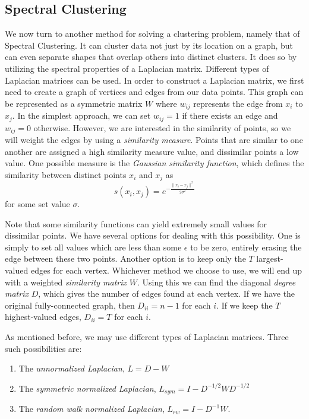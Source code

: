 \subsection*{Spectral Clustering}
We now turn to another method for solving a clustering problem, namely that of Spectral Clustering. 
It can cluster data not just by its location on a graph, but can even separate shapes that overlap others into distinct clusters. 
It does so by utilizing the spectral properties of a Laplacian matrix. 
Different types of Laplacian matrices can be used. 
In order to construct a Laplacian matrix, we first need to create a graph of vertices and edges from our data points. 
This graph can be represented as a symmetric matrix $W$ where $w_{ij}$ represents the edge from $x_i$ to $x_j$. 
In the simplest approach, we can set $w_{ij} = 1$ if there exists an edge and $w_{ij} = 0$ otherwise. 
However, we are interested in the similarity of points, so we will weight the edges by using a \emph{similarity measure}. 
Points that are similar to one another are assigned a high similarity measure value, and dissimilar points a low value. 
One possible measure is the \emph{Gaussian similarity function}, which defines the similarity between distinct points $x_i$ and $x_j$ as
\begin{equation*}
s(x_i,x_j) = e^{- \frac{\| x_i - x_j \| ^2}{2 \sigma ^2}}
\end{equation*}
for some set value $\sigma$.

Note that some similarity functions can yield extremely small values for dissimilar points. 
We have several options for dealing with this possibility. 
One is simply to set all values which are less than some $\epsilon$ to be zero, entirely erasing the edge between these two points. 
Another option is to keep only the $T$ largest-valued edges for each vertex. 
Whichever method we choose to use, we will end up with a weighted \emph{similarity matrix} $W$. 
Using this we can find the diagonal \emph{degree matrix} $D$, which gives the number of edges found at each vertex. 
If we have the original fully-connected graph, then $D_{ii} = n-1$ for each $i$. 
If we keep the $T$ highest-valued edges, $D_{ii} = T$ for each $i$.

As mentioned before, we may use different types of Laplacian matrices.  Three such possibilities are:
\begin{enumerate}
    \item The \emph{unnormalized Laplacian}, $L = D - W$
    \item The \emph{symmetric normalized Laplacian}, $L_{sym} = I - D^{-1/2}WD^{-1/2}$
    \item The \emph{random walk normalized Laplacian}, $L_{rw} = I - D^{-1}W$.
 \end{enumerate}

